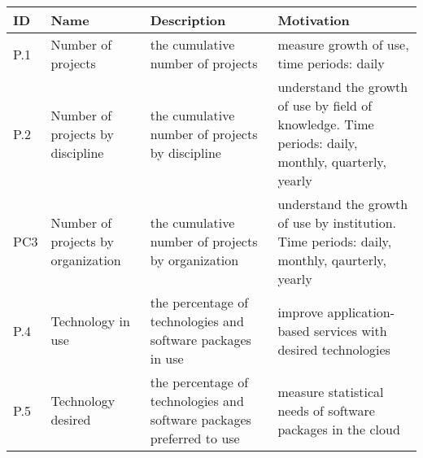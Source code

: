 \newcommand{\eTABLE}{\end{tabular}
\end{center}
\end{scriptsize}
\end{table*}}

\newcommand{\bTABLE}[2]{
\begin{table*}[P]
\caption{#1}
\label{#2}
\bigskip
\begin{scriptsize}
\begin{center}
\begin{tabular}{lp{0.15\textwidth}p{0.3\textwidth}p{0.4\textwidth}}
\hline
\rowcolor{blue!20} \bf ID & \bf Name & \bf Description & \bf Motivation \\
\hline}

\newenvironment{METRICTABLE}[2] {\bTABLE{#1}{#2}}{\eTABLE}


\begin{METRICTABLE}{Project management related metrics}{T:project}
P.1 & Number of projects &  the cumulative number of projects &  measure growth of use, time periods:  daily \\ \hline
P.2 & Number of projects by discipline &  the cumulative number of projects by discipline & understand the growth of use by field of knowledge. Time periods: daily, monthly, quarterly, yearly \\ \hline
PC3 & Number of projects by organization &  the cumulative number of projects by organization & understand the growth of use by institution. Time periods: daily, monthly, qaurterly, yearly \\ \hline
P.4 & Technology in use   &  the percentage of technologies and software packages in use &  improve application-based services with desired technologies \\ \hline
P.5 & Technology desired &  the percentage of technologies and software packages preferred to use & measure statistical needs of software packages in the cloud \\ \hline
\end{METRICTABLE}

